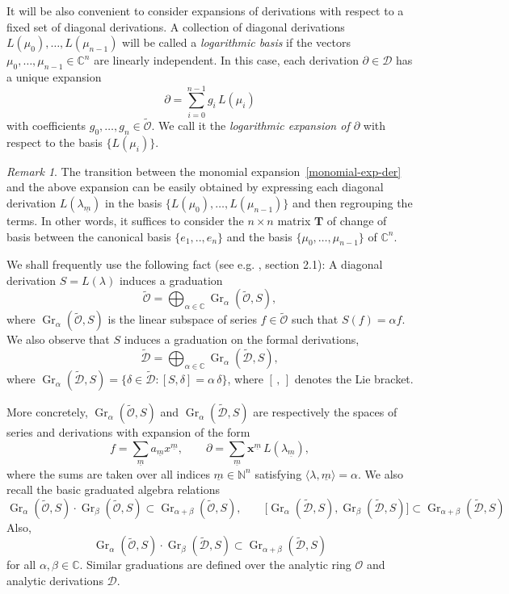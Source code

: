 \documentclass[10pt,twoside,reqno]{amsart}
\theoremstyle{remark}
\theoremstyle{remark}
\newtheorem{remark}[thm]{Remark}
\newcommand{\C}{\mathbb{C}}
\newcommand{\um}{{\underline m}}
\newcommand{\x}{\mathbf{x}}
\newcommand{\Gr}{\operatorname{Gr}}
\newcommand{\tO}{\widetilde{\mathcal{O}}}
\newcommand{\cD}{\mathcal{D}}
\newcommand{\tcD}{\widetilde{\cD}}
\newcommand{\vO}{\mathcal{O}}
\begin{document}
It will be also convenient to consider expansions of derivations with respect to a fixed set of diagonal derivations. A collection of diagonal derivations $L(\mu_0),\ldots,L(\mu_{n-1})$ will be called a {\em logarithmic basis} if the vectors $\mu_0,\ldots,\mu_{n-1}\in \C^n$ are linearly independent. In this case, each derivation 
$\partial \in \cD$ has a unique expansion
\begin{equation}\label{logarithmic-expansion-of-partial}
\partial = \sum_{i=0}^{n-1} g_i \, L(\mu_i)
\end{equation}
with coefficients $g_0,\ldots,g_n \in \tO$. We call it the {\em logarithmic expansion of $\partial$} with respect to the basis $\{L(\mu_i)\}$.
\begin{remark}\label{passage-between-expasions}
The transition between the monomial expansion~\eqref{monomial-exp-der} and the above expansion can be easily obtained by expressing each diagonal derivation $L(\lambda_{\underline m})$ in the basis $\{L(\mu_0),\ldots,L(\mu_{n-1})\}$ and then regrouping the terms. 
In other words, it suffices to consider the $n\times n$ matrix $\mathbf{T}$ of change of basis between the canonical basis $\{e_1,..,e_n\}$ and the basis 
$\{\mu_0,\ldots,\mu_{n-1}\}$ of $\C^n$.
\end{remark}
We shall frequently use the following fact (see e.g. \cite{Martinet1981Norm}, section 2.1): A diagonal derivation $S= L(\lambda)$ induces a graduation
		\begin{equation} \label{graduation-S}
		\tO = \bigoplus_{\alpha \in \C} \Gr_{\alpha}(\tO, S),
	\end{equation}
	where $\Gr_{\alpha}(\tO, S)$ is the linear subspace of series $f\in \tO$ such that $S(f)=\alpha f$.  We also observe that $S$ induces a graduation on the formal derivations, 
    \begin{equation} \label{graduation-S-der}
		\tcD = \bigoplus_{\alpha \in \C} \Gr_{\alpha}(\tcD, S),
	\end{equation}
    where $\Gr_{\alpha}(\tcD, S)= \{\delta \in \tcD : [S,\delta]=\alpha\, \delta\}$, where $[\, ,\, ]$ denotes the Lie bracket. 
    
    More concretely, $\Gr_{\alpha}(\tO, S)$ and $\Gr_{\alpha}(\tcD, S)$ are respectively the spaces of series and derivations with expansion of the form
    $$
    f = \sum_{\underline{m}} a_{\um} x^{\underline{m}},\qquad \partial = \sum_{\um} \x^{\um} \, L(\lambda_{\um}),
    $$
    where the sums are taken over all indices $\underline{m} \in \mathbb{N}^n$ satisfying $\langle \lambda,\underline{m} \rangle = \alpha$. We also recall the basic graduated algebra relations
    \begin{equation}\label{graduated-ids}
    \Gr_{\alpha}(\tO, S)\cdot\Gr_{\beta}(\tO, S)\subset \Gr_{\alpha+\beta}(\tO, S),\qquad  \big[\Gr_{\alpha}(\tcD, S), \Gr_{\beta}(\tcD, S)\big]\subset \Gr_{\alpha+\beta}(\tcD, S)
    \end{equation}
    Also, 
    $$\Gr_{\alpha}(\tO, S)\cdot \Gr_{\beta}(\tcD, S) \subset \Gr_{\alpha+\beta}(\tcD, S)$$
    for all $\alpha,\beta \in \C$. Similar graduations are defined over the analytic ring $\vO$ and analytic derivations $\cD$.
\end{document}
